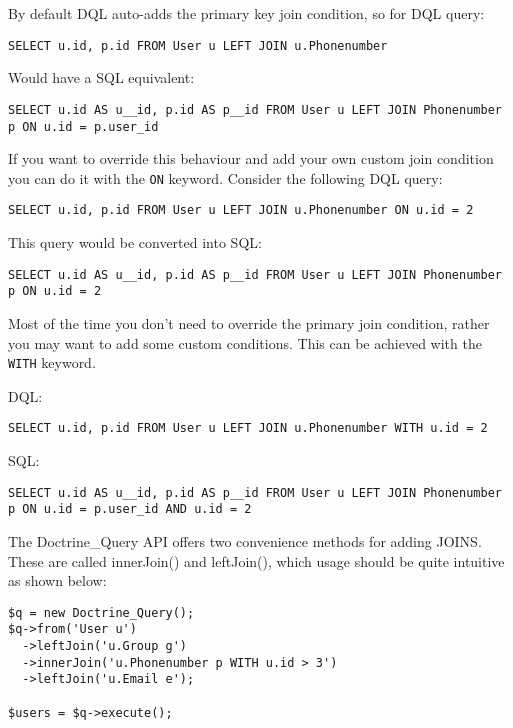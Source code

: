 \documentclass[11pt,a4paper]{report}
\begin{document}
By default DQL auto-adds the primary key join condition, so for DQL query:

\begin{verbatim}
SELECT u.id, p.id FROM User u LEFT JOIN u.Phonenumber
\end{verbatim}

Would have a SQL equivalent:

\begin{verbatim}
SELECT u.id AS u__id, p.id AS p__id FROM User u LEFT JOIN Phonenumber p ON u.id = p.user_id
\end{verbatim}

If you want to override this behaviour and add your own custom join condition you can do it with the \texttt{ON} keyword. Consider the following DQL query:

\begin{verbatim}
SELECT u.id, p.id FROM User u LEFT JOIN u.Phonenumber ON u.id = 2
\end{verbatim}

This query would be converted into SQL:

\begin{verbatim}
SELECT u.id AS u__id, p.id AS p__id FROM User u LEFT JOIN Phonenumber p ON u.id = 2
\end{verbatim}

Most of the time you don't need to override the primary join condition, rather you may want to add some custom conditions. This can be achieved with the \texttt{WITH} keyword.

DQL:

\begin{verbatim}
SELECT u.id, p.id FROM User u LEFT JOIN u.Phonenumber WITH u.id = 2
\end{verbatim}

SQL:

\begin{verbatim}
SELECT u.id AS u__id, p.id AS p__id FROM User u LEFT JOIN Phonenumber p ON u.id = p.user_id AND u.id = 2
\end{verbatim}

The Doctrine\_Query API offers two convenience methods for adding JOINS. These are called innerJoin() and leftJoin(), which usage should be quite intuitive as shown below:

\begin{verbatim}
$q = new Doctrine_Query();
$q->from('User u')
  ->leftJoin('u.Group g')
  ->innerJoin('u.Phonenumber p WITH u.id > 3')
  ->leftJoin('u.Email e');

$users = $q->execute();
\end{verbatim}
\end{document}
